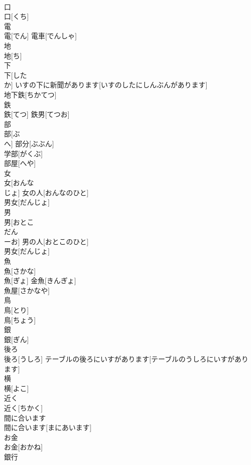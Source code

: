 \documentclass[8pt]{extreport}
\begin{document}
\begin{CJK}{UTF8}{min}
\\	口	
\\	口[くち]	
\\	電	
\\	電[でん]	電車[でんしゃ] 
\\	地	
\\	地[ち]	
\\	下	
\\	下[した 
\\	か]	いすの下に新聞があります[いすのしたにしんぶんがあります] 
\\	地下鉄[ちかてつ] 
\\	鉄	
\\	鉄[てつ]	鉄男[てつお] 
\\	部	
\\	部[ぶ 
\\	へ]	部分[ぶぶん] 
\\	学部[がくぶ] 
\\	部屋[へや] 
\\	女	
\\	女[おんな 
\\	じょ]	女の人[おんなのひと] 
\\	男女[だんじょ] 
\\	男	
\\	男[おとこ 
\\	だん 
\\	ーお]	男の人[おとこのひと] 
\\	男女[だんじょ] 
\\	魚	
\\	魚[さかな] 
\\	魚[ぎょ]	金魚[きんぎょ] 
\\	魚屋[さかなや] 
\\	鳥	
\\	鳥[とり] 
\\	鳥[ちょう]	
\\	銀	
\\	銀[ぎん]	
\\	後ろ	
\\	後ろ[うしろ]	テーブルの後ろにいすがあります[テーブルのうしろにいすがあります] 
\\	横	
\\	横[よこ]	
\\	近く	
\\	近く[ちかく]	
\\	間に合います	
\\	間に合います[まにあいます]	
\\	お金	
\\	お金[おかね]	
\\	銀行	

\end{CJK}
\end{document}
